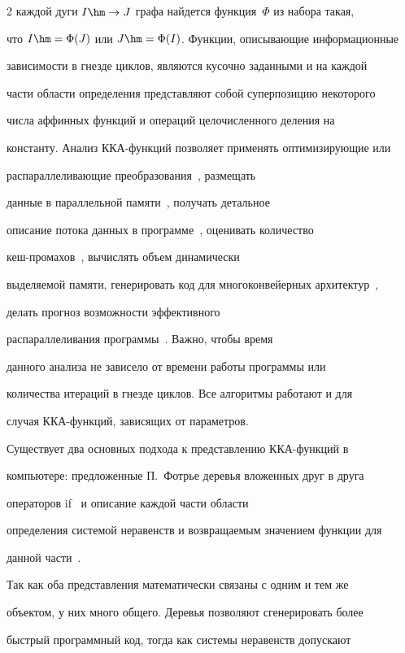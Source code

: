 \begin{multicols}{2}
каждой дуги $I\hm\to J$ графа найдется функция~$\Phi$ из набора такая,

что $I\hm=\Phi(J)$ или $J\hm=\Phi(I)$. Функции, описывающие информационные

зависимости в гнезде циклов, являются кусочно заданными и на каждой

части области определения представляют собой суперпозицию некоторого

числа аффинных функций и операций целочисленного деления на

константу. Анализ ККА-функ\-ций позволяет применять оптимизирующие или

распараллеливающие преобразования~\cite{ShteinbBYa0, Shulj2, Shulj1}, размещать

данные в параллельной памяти~\cite{ShteinbBYa}, получать детальное

описание потока данных в программе~\cite{Feautrier1, Klimov}, оценивать количество

кеш-про\-ма\-хов~\cite{Verdoolaege3}, вычислять объем динамически

выделяемой памяти, генерировать код для многоконвейерных архитектур~\cite{ShteinbR}, 

делать прогноз возможности эффективного

распараллеливания программы~\cite{KritichPut}. Важно, чтобы время

данного анализа не зависело от времени работы программы или

количества итераций в гнезде циклов. Все алгоритмы работают и для

случая ККА-функ\-ций, зависящих от параметров.



Существует два основных подхода к представлению ККА-функ\-ций в

компьютере: предложенные П.~Фотрье деревья вложенных друг в друга

операторов if~\cite{Feautrier2} и описание каждой части области

определения системой неравенств и возвращаемым значением функции для

данной части~\cite{Voevodin, Pugh, Maslov}.

Так как оба представления математически связаны с одним и тем же

объектом, у них много общего. Деревья позволяют сгенерировать более

быстрый программный код, тогда как системы неравенств допускают


\end{multicols}
